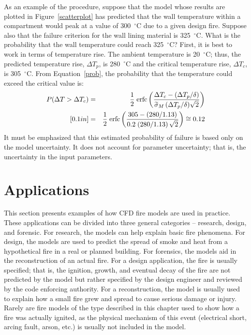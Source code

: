 \documentclass[graybox]{svmult}
\begin{document}
As an example of the procedure, suppose that the model whose results are plotted in Figure~\ref{scatterplot} has predicted that the wall temperature within a compartment would peak at a value of 300~$^\circ$C due to a given design fire. Suppose also that the failure criterion for the wall lining material is 325~$^\circ$C. What is the probability that the wall temperature could reach 325~$^\circ$C? First, it is best to work in terms of temperature rise. The ambient temperature is 20~$^\circ$C; thus, the predicted temperature rise, $\Delta T_p$, is 280~$^\circ$C and the critical temperature rise, $\Delta T_c$, is 305~$^\circ$C. From Equation~\ref{prob}, the probability that the temperature could exceed the critical value is:
\begin{eqnarray}
   P(\Delta T>\Delta T_c) &=& \frac{1}{2} \; \hbox{erfc} \left( \frac{\Delta T_c-(\Delta T_p/\delta)}{\widetilde{\sigma}_M \, (\Delta T_p/\delta) \sqrt{2}} \right) \nonumber \\ [0.1in]
    &=& \frac{1}{2} \; \hbox{erfc} \left( \frac{305-(280/1.13)}{0.2 \; (280/1.13) \, \sqrt{2}} \right) \cong 0.12
\end{eqnarray}
It must be emphasized that this estimated probability of failure is based only on the model uncertainty. It does not account for parameter uncertainty; that is, the uncertainty in the input parameters.



\section{Applications}

This section presents examples of how CFD fire models are used in practice. These applications can be divided into three general categories -- research, design, and forensic. For research, the models can help explain basic fire phenomena. For design, the models are used to predict the spread of smoke and heat from a hypothetical fire in a real or planned building. For forensics, the models aid in the reconstruction of an actual fire. For a design application, the fire is usually specified; that is, the ignition, growth, and eventual decay of the fire are not predicted by the model but rather specified by the design engineer and reviewed by the code enforcing authority. For a reconstruction, the model is usually used to explain how a small fire grew and spread to cause serious damage or injury. Rarely are fire models of the type described in this chapter used to show how a fire was actually ignited, as the physical mechanism of this event (electrical short, arcing fault, arson, etc.) is usually not included in the model.
\end{document}
